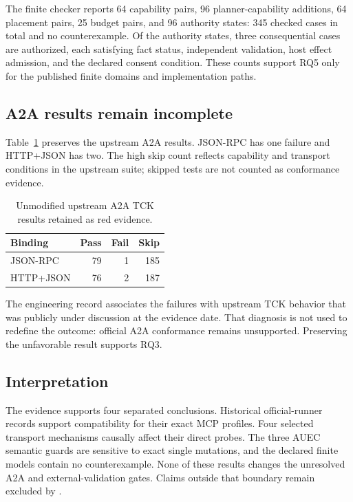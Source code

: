 The finite checker reports 64 capability pairs, 96 planner-capability additions, 64 placement pairs, 25 budget pairs, and 96 authority states: 345 checked cases in total and no counterexample. Of the authority states, three consequential cases are authorized, each satisfying fact status, independent validation, host effect admission, and the declared consent condition. These counts support RQ5 only for the published finite domains and implementation paths.

\subsection{A2A results remain incomplete}
Table~\ref{tab:a2a-results} preserves the upstream A2A results. JSON-RPC has one failure and HTTP+JSON has two. The high skip count reflects capability and transport conditions in the upstream suite; skipped tests are not counted as conformance evidence.

\begin{table}[t]
\caption{Unmodified upstream A2A TCK results retained as red evidence.}
\label{tab:a2a-results}
\centering
\begin{tabular}{lrrr}
\toprule
Binding & Pass & Fail & Skip \\
\midrule
JSON-RPC & 79 & 1 & 185 \\
HTTP+JSON & 76 & 2 & 187 \\
\bottomrule
\end{tabular}
\end{table}

The engineering record associates the failures with upstream TCK behavior that was publicly under discussion at the evidence date. That diagnosis is not used to redefine the outcome: official A2A conformance remains unsupported. Preserving the unfavorable result supports RQ3.

\subsection{Interpretation}
The evidence supports four separated conclusions. Historical official-runner records support compatibility for their exact MCP profiles. Four selected transport mechanisms causally affect their direct probes. The three AUEC semantic guards are sensitive to exact single mutations, and the declared finite models contain no counterexample. None of these results changes the unresolved A2A and external-validation gates. Claims outside that boundary remain excluded by .

